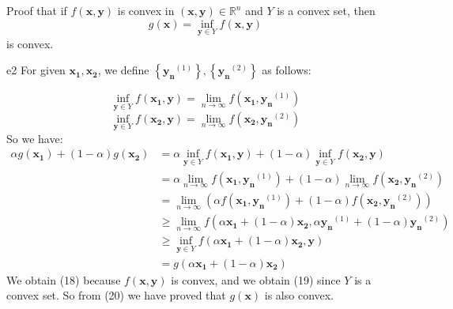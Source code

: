 \documentclass{article}
\newcommand{\xB}{\bm{x}}
\newcommand{\yB}{\bm{y}}
\newcommand{\RBB}{\mathbb{R}}
\begin{document}
\begin{excercise}\label{e2}
Proof that if $f(\xB, \yB)$ is convex in $(\xB, \yB) \in \RBB^n$ and  $Y$ is a convex set, then 
\[
g(\xB) = \inf_{\yB \in Y}f(\xB, \yB)
\]
is convex.
\end{excercise}
\begin{PROOF}{e2}
For given $\bm{x_1},\bm{x_2}$, we define $\left\{\bm{y_n}^{(1)}\right\},\left\{\bm{y_n}^{(2)}\right\}$ as follows:

\begin{equation}
	\inf_{\bm{y}\in Y}f(\bm{x_1},\bm{y})=\mathop{lim}_{n\rightarrow \infty}f(\bm{x_1},\bm{y_n}^{(1)})
\end{equation}
\begin{equation}
	\inf_{\bm{y}\in Y}f(\bm{x_2},\bm{y})=\mathop{lim}_{n\rightarrow \infty}f(\bm{x_2},\bm{y_n}^{(2)})
\end{equation}
So we have:
\begin{align}
	\alpha g(\bm{x_1})+(1-\alpha)g(\bm{x_2})&=\alpha \inf_{\bm{y}\in Y}f(\bm{x_1},\bm{y})+(1-\alpha)\inf_{\bm{y}\in Y}f(\bm{x_2},\bm{y})\\
	&= \alpha \mathop{lim}_{n\rightarrow \infty}f(\bm{x_1},\bm{y_n}^{(1)})+(1-\alpha)\mathop{lim}_{n\rightarrow \infty}f(\bm{x_2},\bm{y_n}^{(2)}) \\
	&= \mathop{lim}_{n\rightarrow \infty}(\alpha f(\bm{x_1},\bm{y_n}^{(1)})+(1-\alpha)f(\bm{x_2},\bm{y_n}^{(2)}) )\\
	&\ge \mathop{lim}_{n\rightarrow \infty}f(\alpha \bm{x_1}+(1-\alpha)\bm{x_2},\alpha \bm{y_n}^{(1)}+(1-\alpha)\bm{y_n}^{(2)})\\
	&\ge \inf_{\bm{y}\in Y}f(\alpha \bm{x_1}+(1-\alpha)\bm{x_2},\bm{y})\\
	&=g(\alpha \bm{x_1}+(1-\alpha) \bm{x_2})
\end{align}
We obtain (18) because $f(\bm{x},\bm{y})$ is convex, and we obtain (19) since $Y$ is a convex set.
So from (20) we have proved that $g(\xB)$ is also convex.
\end{PROOF}
\end{document}
